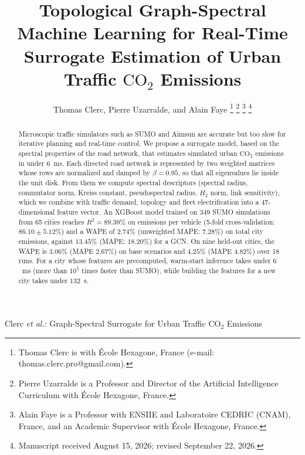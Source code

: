 \documentclass[journal]{IEEEtran}
\begin{document}
\title{Topological Graph-Spectral Machine Learning for Real-Time Surrogate Estimation of Urban Traffic $\text{CO}_2$ Emissions}

\author{Thomas Clerc, Pierre Uzarralde, and Alain Faye%
\thanks{Thomas Clerc is with \'Ecole Hexagone, France (e-mail: thomas.clerc.pro@gmail.com).}%
\thanks{Pierre Uzarralde is a Professor and Director of the Artificial Intelligence Curriculum with \'Ecole Hexagone, France.}%
\thanks{Alain Faye is a Professor with ENSIIE and Laboratoire CEDRIC (CNAM), France, and an Academic Supervisor with \'Ecole Hexagone, France.}%
\thanks{Manuscript received August 15, 2026; revised September 22, 2026.}}

%
{Clerc \MakeLowercase{\textit{et al.}}: Graph-Spectral Surrogate for Urban Traffic $\text{CO}_2$ Emissions}

\maketitle

\begin{abstract}
Microscopic traffic simulators such as SUMO and Aimsun are accurate but too slow for iterative planning and real-time control. We propose a surrogate model, based on the spectral properties of the road network, that estimates simulated urban $\text{CO}_2$ emissions in under $6$~ms. Each directed road network is represented by two weighted matrices whose rows are normalized and damped by $\beta = 0.95$, so that all eigenvalues lie inside the unit disk. From them we compute spectral descriptors (spectral radius, commutator norm, Kreiss constant, pseudospectral radius, $H_2$ norm, link sensitivity), which we combine with traffic demand, topology and fleet electrification into a 47-dimensional feature vector. An XGBoost model trained on 349 SUMO simulations from 65 cities reaches $R^2 = 89.39\%$ on emissions per vehicle (5-fold cross-validation: $86.10 \pm 5.12\%$) and a WAPE of $2.74\%$ (unweighted MAPE: $7.28\%$) on total city emissions, against $13.45\%$ (MAPE: $18.20\%$) for a GCN. On nine held-out cities, the WAPE is $3.06\%$ (MAPE $2.67\%$) on base scenarios and $4.25\%$ (MAPE $4.82\%$) over 18 runs. For a city whose features are precomputed, warm-start inference takes under $6$~ms (more than $10^5$ times faster than SUMO), while building the features for a new city takes under $132$~s.
\end{abstract}
\end{document}
